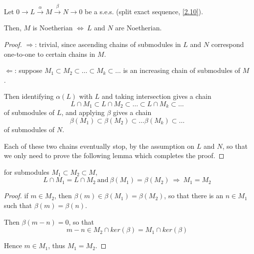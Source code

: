 \documentclass{article}
\theoremstyle{definition}
\newenvironment{lemma}[1]
{\renewcommand\theinnerlemma{#1}\innerlemma}
{\endinnerlemma}
\newenvironment{prop}[1]
{\renewcommand\theinnerprop{#1}\innerprop}
{\endinnerprop}
\begin{document}
\begin{prop}{R.3.4.P}\label{R.3.4.P}
  Let $0 \longrightarrow L \xrightarrow{\ \alpha \ } M \xrightarrow{\ \beta \ } N \longrightarrow 0$ be a s.e.s. (split exact sequence, \ref{2.10}).

  Then, $M$ is Noetherian $\Longleftrightarrow~ L$ and $N$ are Noetherian.
\end{prop}
\begin{proof}
  $\Longrightarrow$: trivial, since ascending chains of submodules in $L$ and $N$ correspond one-to-one to certain chains in $M$.

  $\Longleftarrow$: suppose $M_1 \subset M_2 \subset \ldots \subset M_k \subset \ldots$ is an increasing chain of submodules of $M$.

  Then identifying $\alpha(L)$ with $L$ and taking intersection gives a chain
  $$L \cap M_1 \subset L \cap M_2 \subset \ldots \subset L \cap M_k \subset \ldots$$
  of submodules of $L$, and applying $\beta$ gives a chain
  $$\beta(M_1) \subset \beta(M_2) \subset \ldots \beta(M_k) \subset \ldots$$
  of submodules of $N$.

  Each of these two chains eventually stop, by the assumption on $L$ and $N$, so that we only need to prove the following lemma which completes the proof.
\end{proof}

\begin{lemma}{R.3.4.L}
  for submodules $M_1 \subset M_2 \subset M$,
  $$L \cap M_1 = L \cap M_2 ~\text{and}~ \beta(M_1) = \beta(M_2) ~\Longrightarrow~ M_1 = M_2$$
\end{lemma}
\begin{proof}
  if $m\in M_2$, then $\beta(m) \in \beta(M_1) = \beta(M_2)$, so that there is an $n \in M_1$ such that $\beta(m)=\beta(n)$.

  Then $\beta(m-n)=0$, so that
  $$m - n \in M_2 \cap ker(\beta)=M_1 \cap ker(\beta)$$

  Hence $m \in M_1$, thus $M_1 = M_2$.
\end{proof}
\end{document}
